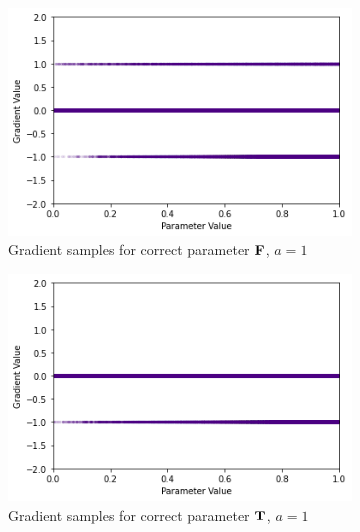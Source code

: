 \begin{figure}[h]
    \centering
    \begin{subfigure}[b]{0.47\textwidth}
        \centering
        \includegraphics[width=\textwidth]{imgs/grad_min_1_falseparam.png}
        \caption{Gradient samples for correct parameter $\textbf{F}$, $a=1$}
        \label{fig:conjgrad10falsem}
    \end{subfigure}
    \begin{subfigure}[b]{0.47\textwidth}
        \centering
        \includegraphics[width=\textwidth]{imgs/grad_min_1_trueparam.png}
        \caption{Gradient samples for correct parameter $\textbf{T}$, $a=1$}
        \label{fig:conjgrad10truem}
    \end{subfigure}
    \begin{subfigure}[b]{0.47\textwidth}
        \centering

\end{subfigure}
\end{figure}
